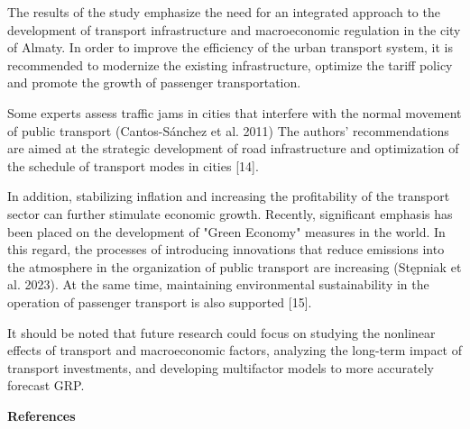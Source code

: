 \begin{multicols}{2}
The results of the study emphasize the need for an integrated approach
to the development of transport infrastructure and macroeconomic
regulation in the city of Almaty. In order to improve the efficiency of
the urban transport system, it is recommended to modernize the existing
infrastructure, optimize the tariff policy and promote the growth of
passenger transportation.

Some experts assess traffic jams in cities that interfere with the
normal movement of public transport (Cantos-Sánchez et al. 2011) The
authors'{} recommendations are aimed at the strategic
development of road infrastructure and optimization of the schedule of
transport modes in cities {[}14{]}.

In addition, stabilizing inflation and increasing the profitability of
the transport sector can further stimulate economic growth. Recently,
significant emphasis has been placed on the development of "Green
Economy" measures in the world. In this regard, the processes of
introducing innovations that reduce emissions into the atmosphere in the
organization of public transport are increasing (Stępniak et al. 2023).
At the same time, maintaining environmental sustainability in the
operation of passenger transport is also supported {[}15{]}.

It should be noted that future research could focus on studying the
nonlinear effects of transport and macroeconomic factors, analyzing the
long-term impact of transport investments, and developing multifactor
models to more accurately forecast GRP.
\end{multicols}

\begin{center}
{\bfseries References}
\end{center}

